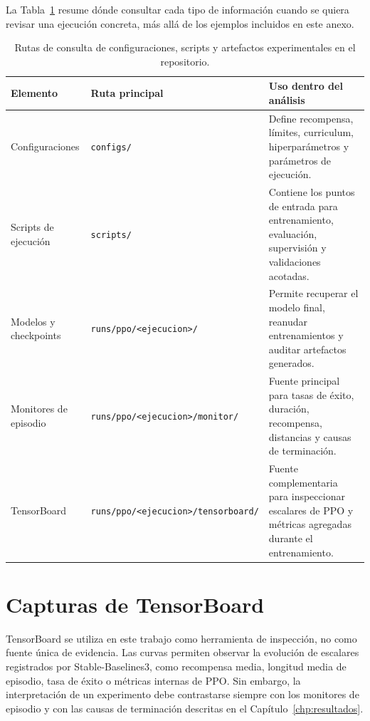 La Tabla~\ref{tab:anexos:consulta_repo} resume dónde consultar cada tipo de
información cuando se quiera revisar una ejecución concreta, más allá de los
ejemplos incluidos en este anexo.

\begin{table}[H]
\centering
\small
\setlength{\tabcolsep}{4pt}
\renewcommand{\arraystretch}{1.15}
\begin{tabularx}{\textwidth}{
>{\raggedright\arraybackslash}p{}
>{\raggedright\arraybackslash}p{}
>{\raggedright\arraybackslash}X
}
\hline
\textbf{Elemento} & \textbf{Ruta principal} & \textbf{Uso dentro del análisis} \\
\hline
Configuraciones &
\texttt{configs/} &
Define recompensa, límites, curriculum, hiperparámetros y parámetros de ejecución. \\

Scripts de ejecución &
\texttt{scripts/} &
Contiene los puntos de entrada para entrenamiento, evaluación, supervisión y validaciones acotadas. \\

Modelos y checkpoints &
\texttt{runs/ppo/<ejecucion>/} &
Permite recuperar el modelo final, reanudar entrenamientos y auditar artefactos generados. \\

Monitores de episodio &
\texttt{runs/ppo/<ejecucion>/monitor/} &
Fuente principal para tasas de éxito, duración, recompensa, distancias y causas de terminación. \\

TensorBoard &
\texttt{runs/ppo/<ejecucion>/tensorboard/} &
Fuente complementaria para inspeccionar escalares de PPO y métricas agregadas durante el entrenamiento. \\
\hline
\end{tabularx}
\caption{Rutas de consulta de configuraciones, scripts y artefactos experimentales en el repositorio.}
\label{tab:anexos:consulta_repo}
\end{table}


\section{Capturas de TensorBoard} \label{sct:anexos:tensorboard}

TensorBoard se utiliza en este trabajo como herramienta de inspección, no como
fuente única de evidencia. Las curvas permiten observar la evolución de escalares
registrados por Stable-Baselines3, como recompensa media, longitud media de
episodio, tasa de éxito o métricas internas de PPO. Sin embargo, la
interpretación de un experimento debe contrastarse siempre con los monitores de
episodio y con las causas de terminación descritas en el
Capítulo~\ref{chp:resultados}.

